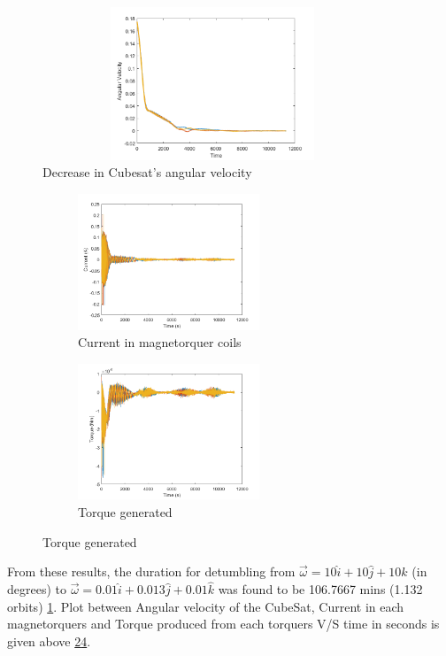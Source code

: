 \begin{figure}[h!]
	\centering
	\includegraphics[width=4in,height=1.8in]{./images/wVt}
	\caption{Decrease in Cubesat's angular velocity}
	\label{fig-wVt}
\end{figure}
\begin{figure}[h!]
	\centering
	\begin{subfigure}[b]{0.45\textwidth}
		\includegraphics[width=\textwidth,height=1.6in]{./images/currentVt}
		\caption{Current in magnetorquer coils}
		\label{fig-currentVt}
	\end{subfigure}
	\begin{subfigure}[b]{0.45\textwidth}
		\centering
		\includegraphics[width=\textwidth,height=1.6in]{./images/torqVt}
		\caption{Torque generated}
		\label{fig-torqVt}
	\end{subfigure}
\end{figure}

From these results, the duration for detumbling from $\vec{\omega}=10\hat{i}+10\hat{j}+10\hat{k}$ (in degrees) to $\vec{\omega}=0.01\hat{i}+0.013\hat{j}+0.01\hat{k}$ was found to be 106.7667 mins (1.132 orbits) \ref{fig-wVt}. Plot between Angular velocity of the CubeSat, Current in each magnetorquers and Torque produced from each torquers V/S time in seconds is given above \ref{fig-currentVt}\ref{fig-torqVt}.
